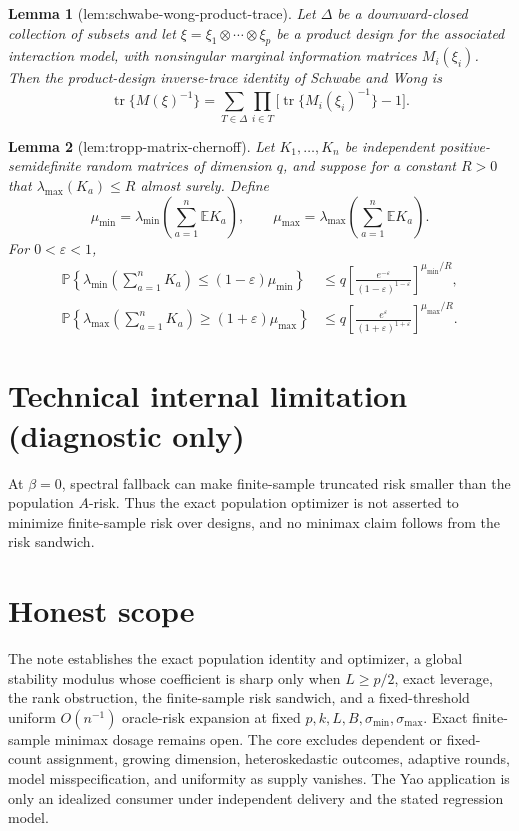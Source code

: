 \documentclass{article}
\newtheorem{lemma}{Lemma}
\begin{document}
\begin{lemma}[lem:schwabe-wong-product-trace]\label{lem:schwabe-wong-product-trace}
Let \(\Delta\) be a downward-closed collection of subsets and let \(\xi=\xi_1\otimes\cdots\otimes\xi_p\) be a product design for the associated interaction model, with nonsingular marginal information matrices \(M_i(\xi_i)\). Then the product-design inverse-trace identity of Schwabe and Wong is
\[
 \operatorname{tr}\{M(\xi)^{-1}\}
 =\sum_{T\in\Delta}\prod_{i\in T}
 \bigl[\operatorname{tr}\{M_i(\xi_i)^{-1}\}-1\bigr].
\]
\end{lemma}

\begin{lemma}[lem:tropp-matrix-chernoff]\label{lem:tropp-matrix-chernoff}
Let \(K_1,\ldots,K_n\) be independent positive-semidefinite random matrices of dimension \(q\), and suppose for a constant \(R>0\) that \(\lambda_{\max}(K_a)\le R\) almost surely. Define
\[
 \mu_{\min}=\lambda_{\min}\!\left(\sum_{a=1}^n\mathbb E K_a\right),
 \qquad
 \mu_{\max}=\lambda_{\max}\!\left(\sum_{a=1}^n\mathbb E K_a\right).
\]
For \(0<\varepsilon<1\),
\[
\begin{aligned}
 \mathbb P\!\left\{\lambda_{\min}\!\left(\sum_{a=1}^nK_a\right)\le(1-\varepsilon)\mu_{\min}\right\}
 &\le q\left[\frac{e^{-\varepsilon}}{(1-\varepsilon)^{1-\varepsilon}}\right]^{\mu_{\min}/R},\\
 \mathbb P\!\left\{\lambda_{\max}\!\left(\sum_{a=1}^nK_a\right)\ge(1+\varepsilon)\mu_{\max}\right\}
 &\le q\left[\frac{e^{\varepsilon}}{(1+\varepsilon)^{1+\varepsilon}}\right]^{\mu_{\max}/R}.
\end{aligned}
\]
\end{lemma}

\section*{Technical internal limitation (diagnostic only)}

At \(\beta=0\), spectral fallback can make finite-sample truncated risk smaller than the population \(A\)-risk. Thus the exact population optimizer is not asserted to minimize finite-sample risk over designs, and no minimax claim follows from the risk sandwich.

\section{Honest scope}

The note establishes the exact population identity and optimizer, a global stability modulus whose coefficient is sharp only when \(L\ge p/2\), exact leverage, the rank obstruction, the finite-sample risk sandwich, and a fixed-threshold uniform \(O(n^{-1})\) oracle-risk expansion at fixed \(p,k,L,B,\sigma_{\min},\sigma_{\max}\). Exact finite-sample minimax dosage remains open. The core excludes dependent or fixed-count assignment, growing dimension, heteroskedastic outcomes, adaptive rounds, model misspecification, and uniformity as supply vanishes. The Yao application is only an idealized consumer under independent delivery and the stated regression model.
\end{document}
